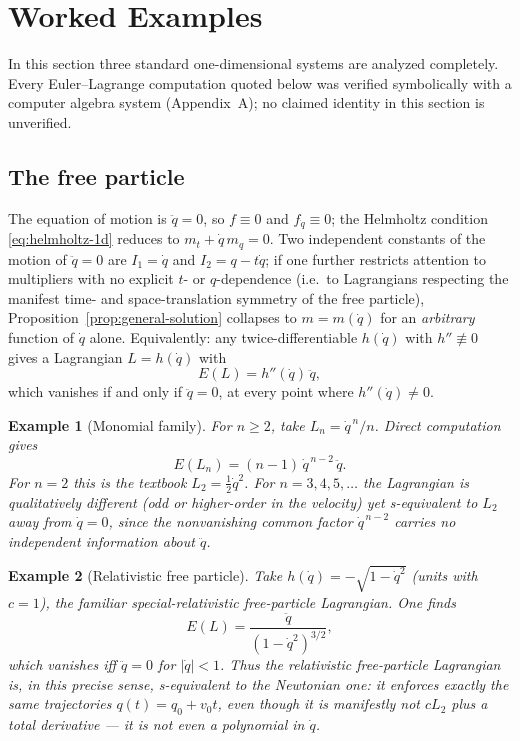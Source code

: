\documentclass[11pt]{article}
\newtheorem{example}{Example}[section]
\theoremstyle{remark}
\begin{document}
\section{Worked Examples}
\label{sec:examples}

In this section three standard one-dimensional systems are analyzed completely. Every Euler--Lagrange computation quoted below was verified symbolically with a computer algebra system (Appendix~A); no claimed identity in this section is unverified.

\subsection{The free particle}

The equation of motion is $\ddot q = 0$, so $f\equiv 0$ and $f_{\dot q}\equiv 0$; the Helmholtz condition \eqref{eq:helmholtz-1d} reduces to $m_t+\dot q\,m_q=0$. Two independent constants of the motion of $\ddot q=0$ are $I_1=\dot q$ and $I_2=q-t\dot q$; if one further restricts attention to multipliers with no explicit $t$- or $q$-dependence (i.e.\ to Lagrangians respecting the manifest time- and space-translation symmetry of the free particle), Proposition~\ref{prop:general-solution} collapses to $m=m(\dot q)$ for an \emph{arbitrary} function of $\dot q$ alone. Equivalently: any twice-differentiable $h(\dot q)$ with $h''\not\equiv 0$ gives a Lagrangian $L=h(\dot q)$ with
\begin{equation}
E(L) = h''(\dot q)\,\ddot q ,
\end{equation}
which vanishes if and only if $\ddot q = 0$, at every point where $h''(\dot q)\neq 0$.

\begin{example}[Monomial family]
For $n\geq 2$, take $L_n = \dot q^{\,n}/n$. Direct computation gives
\begin{equation}
E(L_n) = (n-1)\,\dot q^{\,n-2}\,\ddot q .
\end{equation}
For $n=2$ this is the textbook $L_2=\tfrac12\dot q^2$. For $n=3,4,5,\dots$ the Lagrangian is qualitatively different (odd or higher-order in the velocity) yet s-equivalent to $L_2$ away from $\dot q=0$, since the nonvanishing common factor $\dot q^{\,n-2}$ carries no independent information about $\ddot q$.
\end{example}

\begin{example}[Relativistic free particle]
Take $h(\dot q)=-\sqrt{1-\dot q^2}$ (units with $c=1$), the familiar special-relativistic free-particle Lagrangian. One finds
\begin{equation}
E(L) = \frac{\ddot q}{(1-\dot q^2)^{3/2}},
\end{equation}
which vanishes iff $\ddot q=0$ for $|\dot q|<1$. Thus the relativistic free-particle Lagrangian is, in this precise sense, s-equivalent to the Newtonian one: it enforces exactly the same trajectories $q(t)=q_0+v_0 t$, even though it is manifestly not $c L_2$ plus a total derivative --- it is not even a polynomial in $\dot q$.
\end{example}
\end{document}
